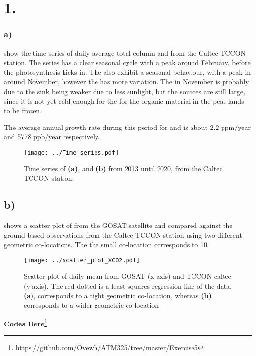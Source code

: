 \section*{1.}

\subsubsection*{a)}  show the time series of
daily average total column  and  from the Caltec TCCON station.
The  series has a 
clear seasonal cycle with a peak around February, before the photosynthesis
kicks in. The  also exhibit a
seasonal behaviour, with a peak in  around November, however the
 has more variation. The  in November is probably due to the
sink being weaker due to less sunlight, but the sources are still large, since
it is not yet cold enough for the for the organic material in the peat-lands to
be frozen. 

The average annual growth rate during this period for  and  is
about 2.2 ppm/year and 5778 ppb/year respectively.  
 
\begin{figure}[htbp]
    \texttt{[image: ../Time\_series.pdf]}
    \centering
    \caption{Time series of  \textbf{(a)}, and  \textbf{(b)} from 2013 until 2020, from the Caltec TCCON station.}
    \label{fig:Time_series_XCH4_XCO2}

\end{figure}

\subsection*{b)}
 shows a scatter plot of  from the GOSAT
satellite and compared against the ground based observations from the Caltec
TCCON station using two different geometric co-locations. The the small
co-location corresponds to 10  
\begin{figure}[htbp]
    \centering
    \texttt{[image: ../scatter\_plot\_XCO2.pdf]}
    \caption{Scatter plot of daily mean  from GOSAT (x-axis) and TCCON caltec (y-axis). The red dotted is a least squares regression line of the data. \textbf{(a)}, corresponds to a tight geometric co-location, whereas \textbf{(b)} corresponds to a wider geometric co-location}
    \label{fig:scatter_XCO2}
\end{figure}

\textbf{Codes Here}\footnote{https://github.com/Ovewh/ATM325/tree/master/Exercise5}